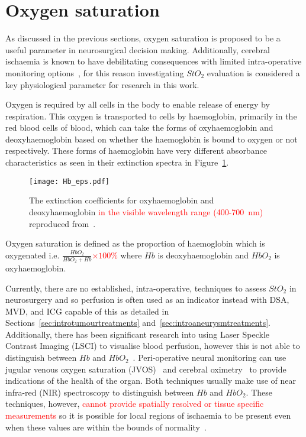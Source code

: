 \section{Oxygen saturation}\label{sec:oxygensat}
As discussed in the previous sections, oxygen saturation is proposed to be a useful parameter in neurosurgical decision making. Additionally, cerebral ischaemia is known to have debilitating consequences with limited intra-operative monitoring options~\citep{Zhou2016}, for this reason investigating $StO_2$ evaluation is considered a key physiological parameter for research in this work. 

Oxygen is required by all cells in the body to enable release of energy by respiration. This oxygen is transported to cells by haemoglobin, primarily in the red blood cells of blood, which can take the forms of oxyhaemoglobin and deoxyhaemoglobin based on whether the haemoglobin is bound to oxygen or not respectively. These forms of haemoglobin have very different absorbance characteristics as seen in their extinction spectra in Figure~\ref{fig:Haemoglobinext}. 
\begin{figure}[h]
    \centering 
    \texttt{[image: Hb\_eps.pdf]}
    \caption{The extinction coefficients for oxyhaemoglobin and deoxyhaemoglobin \textcolor{red}{in the visible wavelength range (400-700~nm)} reproduced from~\citep{Prahl1998}.}
    \label{fig:Haemoglobinext}
\end{figure}
Oxygen saturation is defined as the proportion of haemoglobin which is oxygenated i.e. $\frac{HbO_2}{HbO_2 + Hb}$\textcolor{red}{$\times 100\%$}  where $Hb$ is deoxyhaemoglobin and $HbO_2$ is oxyhaemoglobin. 

Currently, there are no established, intra-operative, techniques to assess $StO_2$ in neurosurgery and so perfusion is often used as an indicator instead with DSA, MVD, and ICG capable of this as detailed in Sections~\ref{sec:introtumourtreatments} and~\ref{sec:introaneurysmtreatments}. Additionally, there has been significant research into using Laser Speckle Contrast Imaging (LSCI) to visualise blood perfusion, however this is not able to distinguish between $Hb$ and $HbO_2$~\citep{Dunn2012, Zhong2021}. Peri-operative neural monitoring can use jugular venous oxygen saturation (JVOS)~\citep{Raith2020} and cerebral oximetry~\citep{Lian2020} to provide indications of the health of the organ. Both techniques usually make use of near infra-red (NIR) spectroscopy to distinguish between $Hb$ and $HbO_2$. These techniques, however,  \textcolor{red}{cannot provide spatially resolved or tissue specific measurements} so it is possible for local regions of ischaemia to be present even when these values are within the bounds of normality~\citep{Raith2020, Zhong2021}.

